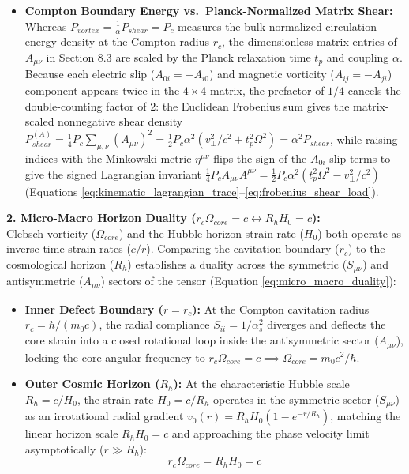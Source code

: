 \begin{itemize}
    \item \textbf{Compton Boundary Energy vs.\ Planck-Normalized Matrix Shear:} Whereas $P_{vortex} = \frac{1}{\alpha}P_{shear} = P_c$ measures the bulk-normalized circulation energy density at the Compton radius $r_c$, the dimensionless matrix entries of $A_{\mu\nu}$ in Section 8.3 are scaled by the Planck relaxation time $t_p$ and coupling $\alpha$. Because each electric slip ($A_{0i} = -A_{i0}$) and magnetic vorticity ($A_{ij} = -A_{ji}$) component appears twice in the $4 \times 4$ matrix, the prefactor of $1/4$ cancels the double-counting factor of $2$: the Euclidean Frobenius sum gives the matrix-scaled nonnegative shear density $P_{shear}^{(A)} = \frac{1}{4}P_c \sum_{\mu,\nu}(A_{\mu\nu})^2 = \frac{1}{2}P_c \alpha^2(v_\perp^2/c^2 + t_p^2\Omega^2) = \alpha^2 P_{shear}$, while raising indices with the Minkowski metric $\eta^{\mu\nu}$ flips the sign of the $A_{0i}$ slip terms to give the signed Lagrangian invariant $\frac{1}{4}P_c A_{\mu\nu}A^{\mu\nu} = \frac{1}{2}P_c \alpha^2(t_p^2\Omega^2 - v_\perp^2/c^2)$ (Equations \ref{eq:kinematic_lagrangian_trace}--\ref{eq:frobenius_shear_load}). %
\end{itemize}

\vspace{0.2 cm}

\textbf{2. Micro-Macro Horizon Duality ($r_c \Omega_{core} = c \leftrightarrow R_h H_0 = c$):} \\
Clebsch vorticity ($\Omega_{core}$) and the Hubble horizon strain rate ($H_0$) both operate as inverse-time strain rates ($c/r$). Comparing the cavitation boundary ($r_c$) to the cosmological horizon ($R_h$) establishes a duality across the symmetric ($S_{\mu\nu}$) and antisymmetric ($A_{\mu\nu}$) sectors of the tensor (Equation \ref{eq:micro_macro_duality}):
\begin{itemize}
    \item \textbf{Inner Defect Boundary ($r = r_c$):} At the Compton cavitation radius $r_c = \hbar/(m_0 c)$, the radial compliance $S_{ii} = 1/\alpha_s^2$ diverges and deflects the core strain into a closed rotational loop inside the antisymmetric sector ($A_{\mu\nu}$), locking the core angular frequency to $r_c \Omega_{core} = c \implies \Omega_{core} = m_0 c^2/\hbar$.
    \item \textbf{Outer Cosmic Horizon ($R_h$):} At the characteristic Hubble scale $R_h = c/H_0$, the strain rate $H_0 = c/R_h$ operates in the symmetric sector ($S_{\mu\nu}$) as an irrotational radial gradient $v_0(r) = R_h H_0(1 - e^{-r/R_h})$, matching the linear horizon scale $R_h H_0 = c$ and approaching the phase velocity limit asymptotically ($r \gg R_h$):
    \begin{equation}
        r_c \Omega_{core} = R_h H_0 = c \label{eq:micro_macro_duality}
    \end{equation}
\end{itemize}




